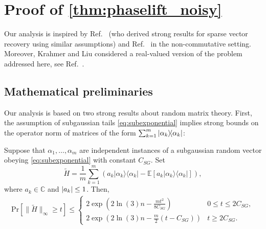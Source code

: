 
\section{Proof of \cref{thm:phaselift_noisy}}
\label{sec:pl.main_proof}

Our analysis is inspired by Ref.~\cite{dirksen_gap_2015} (who derived strong results for sparse vector recovery using similar assumptions) and Ref.~\cite{kabanava_stable_2016} in the non-commutative setting. Moreover, Krahmer and Liu considered a real-valued version of the problem addressed here, see Ref.~\cite{krahmer_phase_2017}.




\subsection{Mathematical preliminaries}

Our analysis is based on two strong results about random matrix theory. First, the assumption of subgaussian tails \eqref{eq:subexponential} implies strong bounds on the operator norm of matrices of the form $\sum_{k=1}^m \ket{{\alpha_k}}\bra{\alpha_k}$:

\begin{theorem} \label{thm:bernstein}
Suppose that $\alpha_1,\ldots,\alpha_m$ are independent instances of a subgaussian random vector obeying \eqref{eq:subexponential} with constant $C_{SG}$.
Set
\begin{equation}
  \tilde{ H} = \frac{1}{m} \sum_{k=1}^m \left( a_k |\alpha_k \rangle \! \langle \alpha_k| - \mathbb{E} \left[ a_k |\alpha_k \rangle \! \langle \alpha_k| \right] \right),
  \label{eq:Htilde}
\end{equation}
where $a_k \in \mathbb{C}$ and ${\vert a_k\vert} \leq 1$.
Then,
\begin{align*}
\mathrm{Pr} \left[ \| \tilde{ H} \|_\infty \geq t \right]
\leq
\begin{cases}
2 \exp \left( 2 \ln (3) n  - \frac{mt^2}{8 C_{SG}} \right) & 0 \leq t \leq 2C_{SG}, \\
2 \exp \left( 2 \ln (3) n - \frac{m}{2} (t- C_{SG} )  \right) & t \geq 2 C_{SG}.
\end{cases}
\end{align*}
\end{theorem}


